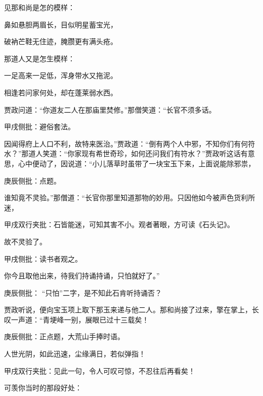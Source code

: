 \begin{parag}
    见那和尚是怎的模样：
\end{parag}


\begin{poem}
    \begin{pl}鼻如悬胆两眉长，目似明星蓄宝光，\end{pl}
    \begin{pl}破衲芒鞋无住迹，腌臜更有满头疮。\end{pl}
\end{poem}

\begin{parag}
    那道人又是怎生模样：
\end{parag}
\begin{poem}

    \begin{pl}一足高来一足低，浑身带水又拖泥。\end{pl}
    \begin{pl}相逢若问家何处，却在蓬莱弱水西。\end{pl}
\end{poem}

\begin{parag}
    贾政问道：“你道友二人在那庙里焚修。”那僧笑道：“长官不须多话。\begin{note}甲戌侧批：避俗套法。\end{note}因闻得府上人口不利，故特来医治。”贾政道：“倒有两个人中邪，不知你们有何符水？”那道人笑道：“你家现有希世奇珍，如何还问我们有符水？”贾政听这话有意思，心中便动了，因说道：“小儿落草时虽带了一块宝玉下来，上面说能除邪祟，\begin{note}庚辰侧批：点题。\end{note}谁知竟不灵验。”那僧道：“长官你那里知道那物的妙用。只因他如今被声色货利所迷，\begin{note}甲戌双行夹批：石皆能迷，可知其害不小。观者著眼，方可读《石头记》。\end{note}故不灵验了。\begin{note}甲戌侧批：读书者观之。\end{note}你今且取他出来，待我们持诵持诵，只怕就好了。”\begin{note}庚辰侧批： “只怕”二字，是不知此石肯听持诵否？\end{note}
\end{parag}


\begin{parag}
    贾政听说，便向宝玉项上取下那玉来递与他二人。那和尚接了过来，擎在掌上，长叹一声道：“青埂峰一别，展眼已过十三载矣！\begin{note}庚辰侧批：正点题，大荒山手捧时语。\end{note}人世光阴，如此迅速，尘缘满日，若似弹指！\begin{note}甲戌双行夹批：见此一句，令人可叹可惊，不忍往后再看矣！\end{note}可羡你当时的那段好处：
\end{parag}


